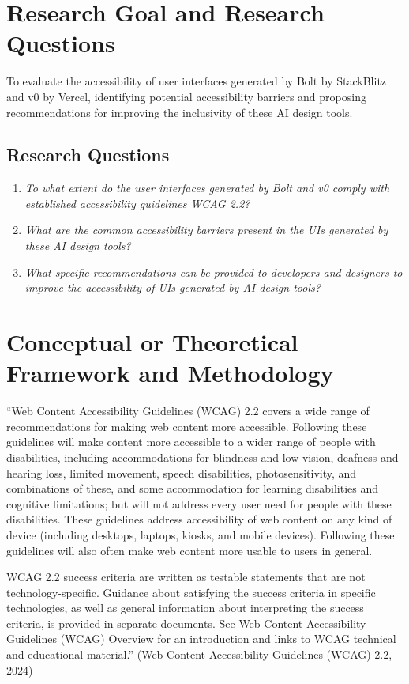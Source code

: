 \documentclass{article}
\begin{document}
\section{Research Goal and Research Questions}
To evaluate the accessibility of user interfaces generated by Bolt by StackBlitz and v0 by Vercel, identifying potential accessibility barriers and proposing recommendations for improving the inclusivity of these AI design tools.

\subsection{Research Questions}

\begin{enumerate}
    \item \textit{To what extent do the user interfaces generated by Bolt and v0 comply with established accessibility guidelines WCAG 2.2?}
    \item \textit{What are the common accessibility barriers present in the UIs generated by these AI design tools?}
    \item \textit{What specific recommendations can be provided to developers and designers to improve the accessibility of UIs generated by AI design tools?}
\end{enumerate}

\section{Conceptual or Theoretical Framework and Methodology}
“Web Content Accessibility Guidelines (WCAG) 2.2 covers a wide range of recommendations for making web content more accessible. Following these guidelines will make content more accessible to a wider range of people with disabilities, including accommodations for blindness and low vision, deafness and hearing loss, limited movement, speech disabilities, photosensitivity, and combinations of these, and some accommodation for learning disabilities and cognitive limitations; but will not address every user need for people with these disabilities. These guidelines address accessibility of web content on any kind of device (including desktops, laptops, kiosks, and mobile devices). Following these guidelines will also often make web content more usable to users in general.

WCAG 2.2 success criteria are written as testable statements that are not technology-specific. Guidance about satisfying the success criteria in specific technologies, as well as general information about interpreting the success criteria, is provided in separate documents. See Web Content Accessibility Guidelines (WCAG) Overview for an introduction and links to WCAG technical and educational material.” (Web Content Accessibility Guidelines (WCAG) 2.2, 2024)
\end{document}
